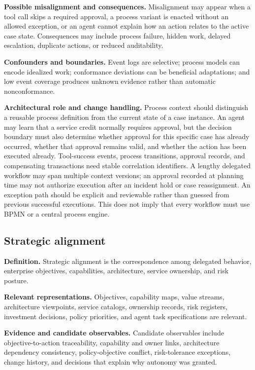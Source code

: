 \documentclass[11pt,letterpaper]{article}
\begin{document}
\textbf{Possible misalignment and consequences.} Misalignment may appear when a tool call skips a required approval, a process variant is enacted without an allowed exception, or an agent cannot explain how an action relates to the active case state. Consequences may include process failure, hidden work, delayed escalation, duplicate actions, or reduced auditability.

\textbf{Confounders and boundaries.} Event logs are selective; process models can encode idealized work; conformance deviations can be beneficial adaptations; and low event coverage produces unknown evidence rather than automatic nonconformance.

\textbf{Architectural role and change handling.} Process context should distinguish a reusable process definition from the current state of a case instance. An agent may learn that a service credit normally requires approval, but the decision boundary must also determine whether approval for this specific case has already occurred, whether that approval remains valid, and whether the action has been executed already. Tool-success events, process transitions, approval records, and compensating transactions need stable correlation identifiers. A lengthy delegated workflow may span multiple context versions; an approval recorded at planning time may not authorize execution after an incident hold or case reassignment. An exception path should be explicit and reviewable rather than guessed from previous successful executions. This does not imply that every workflow must use BPMN or a central process engine.

\subsection{Strategic alignment}
\textbf{Definition.} Strategic alignment is the correspondence among delegated behavior, enterprise objectives, capabilities, architecture, service ownership, and risk posture.

\textbf{Relevant representations.} Objectives, capability maps, value streams, architecture viewpoints, service catalogs, ownership records, risk registers, investment decisions, policy priorities, and agent task specifications are relevant.

\textbf{Evidence and candidate observables.} Candidate observables include objective-to-action traceability, capability and owner links, architecture dependency consistency, policy-objective conflict, risk-tolerance exceptions, change history, and decisions that explain why autonomy was granted.
\end{document}
